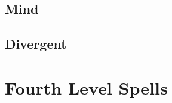 \begin{multicols}{2}

\subsection{Mind}


\subsection{Divergent}


\end{multicols}

\section{Fourth Level Spells}


